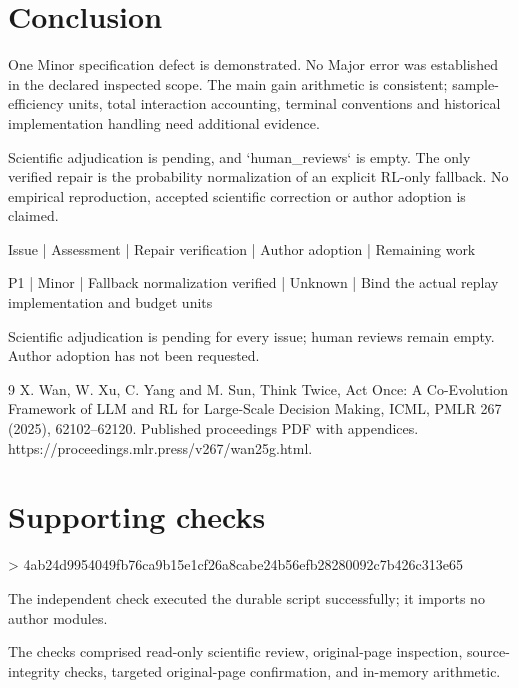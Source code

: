 \documentclass[10pt]{article}
\begin{document}
\section*{Conclusion}
One Minor specification defect is demonstrated. No Major error was established in the declared inspected scope. The main gain arithmetic is consistent; sample-efficiency units, total interaction accounting, terminal conventions and historical implementation handling need additional evidence.\par
Scientific adjudication is pending, and `human\_reviews` is empty. The only verified repair is the probability normalization of an explicit RL-only fallback. No empirical reproduction, accepted scientific correction or author adoption is claimed.\par
Issue | Assessment | Repair verification | Author adoption | Remaining work\par
P1 | Minor | Fallback normalization verified | Unknown | Bind the actual replay implementation and budget units\par
Scientific adjudication is pending for every issue; human reviews remain empty. Author adoption has not been requested.\par
9 X. Wan, W. Xu, C. Yang and M. Sun, Think Twice, Act Once: A Co-Evolution Framework of LLM and RL for Large-Scale Decision Making, ICML, PMLR 267 (2025), 62102–62120. Published proceedings PDF with appendices. https://proceedings.mlr.press/v267/wan25g.html.\par
\section*{Supporting checks}
> 4ab24d9954049fb76ca9b15e1cf26a8cabe24b56efb28280092c7b426c313e65\par
The independent check executed the durable script successfully; it imports no author modules.\par
The checks comprised read-only scientific review, original-page inspection, source-integrity checks, targeted original-page confirmation, and in-memory arithmetic.\par
\end{document}
